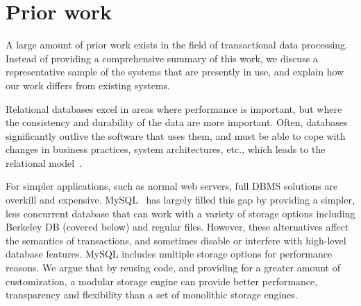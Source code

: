 \documentclass[10pt,letterpaper,twocolumn,english]{article}
\newcommand{\yad}{Lemon\xspace}
\begin{document}
\section{Prior work}

A large amount of prior work exists in the field of transactional data
processing.  Instead of providing a comprehensive summary of this
work, we discuss a representative sample of the systems that are
presently in use, and explain how our work differs from existing
systems.




Relational databases excel in areas
where performance is important, but where the consistency and
durability of the data are more important.  Often, databases significantly
outlive the software that uses them, and must be able to cope with
changes in business practices, system architectures,
etc., which leads to the relational model~\cite{relational}.

For simpler applications, such as normal web servers, full DBMS
solutions are overkill and expensive.  MySQL~\cite{mysql} has
largely filled this gap by providing a simpler, less concurrent
database that can work with a variety of storage options including
Berkeley DB (covered below) and regular files.  However, these
alternatives affect the semantics of transactions, and sometimes 
disable or interfere with high-level database features.  MySQL 
includes multiple storage options for performance reasons.  
We argue that by reusing code, and providing for a greater amount 
of customization, a modular storage engine can provide better 
performance, transparency and flexibility than a 
set of monolithic storage engines.

\end{document}
